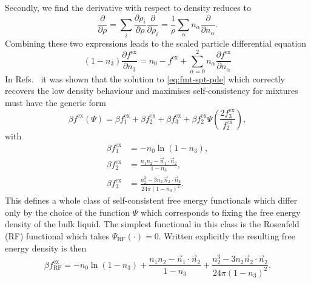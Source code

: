 Secondly, we find the derivative with respect to density reduces to
\begin{equation*}
  \frac{\partial}{\partial \rho}
  =
  \sum_i
  \frac{\partial \rho_i}{\partial \rho}
  \frac{\partial}{\partial \rho_i}
  =
  \frac{1}{\rho}
  \sum_\alpha
  n_\alpha
  \frac{\partial}{\partial n_\alpha}.
\end{equation*}
Combining these two expressions leads to the scaled particle%
differential equation \cite{RosenfeldPRL1989}
\begin{equation}\label{eq:fmt-spt-pde}
  (1 - n_3) \frac{\partial f^\mathrm{ex}}{\partial n_3}
  =
  n_0 - f^\mathrm{ex}
  + \sum_{\alpha = 0}^2
  n_\alpha \frac{\partial f^\mathrm{ex}}{\partial n_\alpha}
\end{equation}
In Refs.\ \cite{SantosJCP2012,SantosPRE2012} it was shown that the solution to \eqref{eq:fmt-spt-pde} which correctly recovers the low density behaviour and maximises self-consistency for mixtures must have the generic form
\begin{equation}\label{eq:santos-fmt}
  \beta f^\mathrm{ex}(\Psi)
  =
  \beta f^\mathrm{ex}_1 + \beta f^\mathrm{ex}_2 + \beta f^\mathrm{ex}_3
  + \beta f^\mathrm{ex}_2 \Psi\left(\frac{2 f^\mathrm{ex}_3}{f^\mathrm{ex}_2}\right),
\end{equation}
with
\begin{subequations}
  \begin{align}
    \beta f^\mathrm{ex}_1
    &=
    - n_0 \ln{(1 - n_3)},
    \\
    \beta f^\mathrm{ex}_2
    &=
    \frac{n_1 n_2 - \vec{n}_1 \cdot \vec{n}_2}{1 - n_3},
    \\
    \beta f^\mathrm{ex}_3
    &=
    \frac{n_2^3 - 3 n_2 \, \vec{n}_2 \cdot \vec{n}_2}{24 \pi (1 - n_3)^2}.
  \end{align}
\end{subequations}
This defines a whole class of self-consistent free energy functionals which differ only by the choice of the function $\Psi$ which corresponds to fixing the free energy density of the bulk liquid.
The simplest functional in this class is the Rosenfeld (RF) functional which takes $\Psi_\mathrm{RF}(\cdot) = 0$.
Written explicitly the resulting free energy density is then \cite{RosenfeldPRL1989}
\begin{equation}\label{eq:rosenfeld-functional}
  \beta f_\mathrm{RF}^\mathrm{ex}
  =
  - n_0 \ln{(1 - n_3)}
  + \frac{n_1 n_2 - \vec{n}_1 \cdot \vec{n}_2}{1 - n_3}
  + \frac{n_2^3 - 3 n_2 \vec{n}_2 \cdot \vec{n}_2}{24 \pi (1 - n_3)^2}.
\end{equation}


